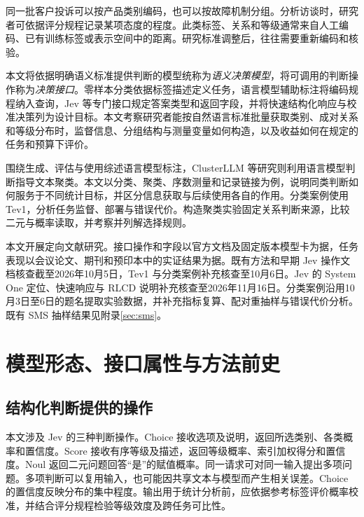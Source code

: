 \documentclass[UTF8,a4paper,zihao=-4,fontset=fandol]{ctexart}
\begin{document}
同一批客户投诉可以按产品类别编码，也可以按故障机制分组。分析访谈时，研究者可依据评分规程记录某项态度的程度。此类标签、关系和等级通常来自人工编码、已有训练标签或表示空间中的距离。研究标准调整后，往往需要重新编码和核验。

本文将依据明确语义标准提供判断的模型统称为\emph{语义决策模型}，将可调用的判断操作称为\emph{决策接口}。零样本分类依据标签描述定义任务，语言模型辅助标注将编码规程纳入查询，Jev 等专门接口规定答案类型和返回字段，并将快速结构化响应与校准决策列为设计目标\citep{yin2019,tan2024,typesafe-intro,typesafe-system-one,typesafe-primer}。本文考察研究者能按自然语言标准批量获取类别、成对关系和等级分布时，监督信息、分组结构与测量变量如何构造，以及收益如何在规定的任务和预算下评价。

\citet{tan2024}围绕生成、评估与使用综述语言模型标注，ClusterLLM 等研究则利用语言模型判断指导文本聚类\citep{clusterllm2023,viswanathan2024,cequel2025}。本文以分类、聚类、序数测量和记录链接为例，说明同类判断如何服务于不同统计目标，并区分信息获取与后续使用各自的作用。分类案例使用 Tev1，分析任务监督、部署与错误代价。构造聚类实验固定关系判断来源，比较二元与概率读取，并考察并列解选择规则。

本文开展定向文献研究。接口操作和字段以官方文档及固定版本模型卡为据，任务表现以会议论文、期刊和预印本中的实证结果为据。既有方法和早期 Jev 操作文档核查截至2026年10月5日，Tev1 与分类案例补充核查至10月6日。Jev 的 System One 定位、快速响应与 RLCD 说明补充核查至2026年11月16日。分类案例沿用10月3日至6日的题名提取实验数据，并补充指标复算、配对重抽样与错误代价分析。既有 SMS 抽样结果见附录\ref{sec:sms}。

\section{模型形态、接口属性与方法前史}\label{sec:history}

\subsection{结构化判断提供的操作}

本文涉及 Jev 的三种判断操作。Choice 接收选项及说明，返回所选类别、各类概率和置信度。Score 接收有序等级及描述，返回等级概率、索引加权得分和置信度。Noul 返回二元问题回答“是”的赋值概率\citep{typesafe-choice,typesafe-score,typesafe-noul}。同一请求可对同一输入提出多项问题\citep{typesafe-intro}。多项判断可以复用输入，也可能因共享文本与模型而产生相关误差。Choice 的置信度反映分布的集中程度。输出用于统计分析前，应依据参考标签评价概率校准，并结合评分规程检验等级效度及跨任务可比性。
\end{document}
